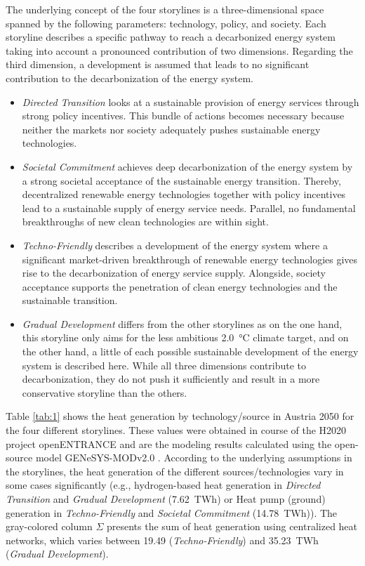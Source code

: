 The underlying concept of the four storylines is a three-dimensional space spanned by the following parameters: technology, policy, and society. Each storyline describes a specific pathway to reach a decarbonized energy system taking into account a pronounced contribution of two dimensions. Regarding the third dimension, a development is assumed that leads to no significant contribution to the decarbonization of the energy system. 

\begin{itemize}
	\item \textit{Directed Transition} looks at a sustainable provision of energy services through strong policy incentives. This bundle of actions becomes necessary because neither the markets nor society adequately pushes sustainable energy technologies.
	\item \textit{Societal Commitment} achieves deep decarbonization of the energy system by a strong societal acceptance of the sustainable energy transition. Thereby, decentralized renewable energy technologies together with policy incentives lead to a sustainable supply of energy service needs. Parallel, no fundamental breakthroughs of new clean technologies are within sight.
	\item \textit{Techno-Friendly} describes a development of the energy system where a significant market-driven breakthrough of renewable energy technologies gives rise to the decarbonization of energy service supply. Alongside, society acceptance supports the penetration of clean energy technologies and the sustainable transition.
	\item \textit{Gradual Development} differs from the other storylines as on the one hand, this storyline only aims for the less ambitious \SI{2.0}{\degreeCelsius} climate target, and on the other hand, a little of each possible sustainable development of the energy system is described here. While all three dimensions contribute to decarbonization, they do not push it sufficiently and result in a more conservative storyline than the others.
\end{itemize}

Table \ref{tab:1} shows the heat generation by technology/source in Austria 2050 for the four different storylines. These values were obtained in course of the H2020 project openENTRANCE and are the modeling results calculated using the open-source model GENeSYS-MODv2.0 \cite{burandt2018genesys}. According to the underlying assumptions in the storylines, the heat generation of the different sources/technologies vary in some cases significantly (e.g., hydrogen-based heat generation in \textit{Directed Transition} and \textit{Gradual Development} (\SI{7.62}{TWh}) or Heat pump (ground) generation in \textit{Techno-Friendly} and \textit{Societal Commitment} (\SI{14.78}{TWh})). The gray-colored column $\Sigma$ presents the sum of heat generation using centralized heat networks, which varies between \SI{19.49}{} (\textit{Techno-Friendly}) and \SI{35.23}{TWh} (\textit{Gradual Development}).


